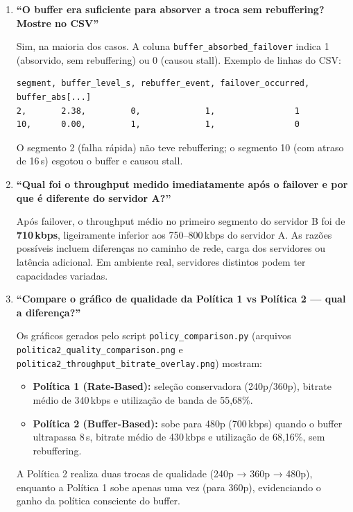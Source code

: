 \documentclass[
    12pt,
    a4paper,
    oneside
]{article}
\begin{document}
\begin{enumerate}
    \item \textbf{“O buffer era suficiente para absorver a troca sem rebuffering? Mostre no CSV”}

    Sim, na maioria dos casos. A coluna \texttt{buffer\_absorbed\_failover} indica 1 (absorvido, sem rebuffering) ou 0 (causou stall). Exemplo de linhas do CSV:
{\footnotesize
    \begin{verbatim}
segment, buffer_level_s, rebuffer_event, failover_occurred, buffer_abs[...]
2,       2.38,         0,             1,                1
10,      0.00,         1,             1,                0
    \end{verbatim}
}
    O segmento 2 (falha rápida) não teve rebuffering; o segmento 10 (com atraso de 16\,s) esgotou o buffer e causou stall.

    \item \textbf{“Qual foi o throughput medido imediatamente após o failover e por que é diferente do servidor A?”}

    Após failover, o throughput médio no primeiro segmento do servidor B foi de \textbf{710\,kbps}, ligeiramente inferior aos 750–800\,kbps do servidor A. As razões possíveis incluem diferenças no caminho de rede, carga dos servidores ou latência adicional. Em ambiente real, servidores distintos podem ter capacidades variadas.

    \item \textbf{“Compare o gráfico de qualidade da Política 1 vs Política 2 — qual a diferença?”}

    Os gráficos gerados pelo script \texttt{policy\_comparison.py} (arquivos \texttt{politica2\_quality\_comparison.png} e \texttt{politica2\_throughput\_bitrate\_overlay.png}) mostram:
    \begin{itemize}
        \item \textbf{Política 1 (Rate-Based):} seleção conservadora (240p/360p), bitrate médio de 340\,kbps e utilização de banda de 55,68\%.
        \item \textbf{Política 2 (Buffer-Based):} sobe para 480p (700\,kbps) quando o buffer ultrapassa 8\,s, bitrate médio de 430\,kbps e utilização de 68,16\%, sem rebuffering.
    \end{itemize}
    A Política 2 realiza duas trocas de qualidade (240p → 360p → 480p), enquanto a Política 1 sobe apenas uma vez (para 360p), evidenciando o ganho da política consciente do buffer.
\end{enumerate}

\end{document}
